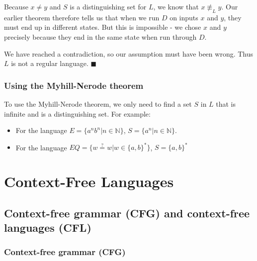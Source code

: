 \documentclass[12pt, letterpaper, oneside]{book}
\begin{document}
Because $x \neq y$ and $S$ is a distinguishing set for $L$, we know that $x \not\equiv_L y$. Our earlier theorem
therefore tells us that when we run $D$ on inputs $x$ and $y$, they must end up in different states. But this is
impossible - we chose $x$ and $y$ precisely because they end in the same state when run through $D$.

We have reached a contradiction, so our assumption must have been wrong. Thus $L$ is not a regular language.
$\blacksquare$

\subsection{Using the Myhill-Nerode theorem}

To use the Myhill-Nerode theorem, we only need to find a set $S$ in $L$ that is infinite and is a distinguishing set.
For example:
\begin{itemize}
  \item For the language $E = \{ a^nb^n | n \in \mathbb{N} \}$, $S = \{ a^n | n \in \mathbb{N} \}$.
  \item For the language $EQ = \{ w\stackrel{?}{=}w | w \in \{a, b\}^* \}$, $S = \{a, b\}^*$
\end{itemize}

%
%

\chapter{Context-Free Languages}

\section{Context-free grammar (CFG) and context-free languages (CFL)}

\subsection{Context-free grammar (CFG)}
\end{document}
